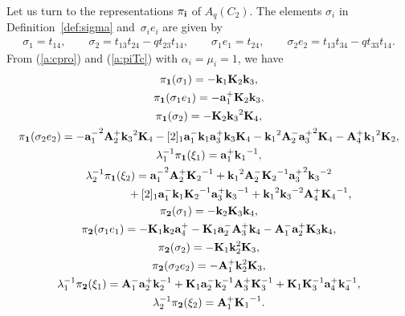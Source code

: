 \documentclass[11pt]{article}
\begin{document}
Let us turn to the representations $\pi_{{\bf i}}$ of $A_q(C_2)$.
The elements $\sigma_i$ in Def\/inition~\ref{def:sigma}
and~$\sigma_ie_i$
are given by
\begin{gather}\label{c:kobetsu}
\sigma_1 = t_{14}, \qquad
\sigma_2 = t_{13}t_{24}-qt_{23}t_{14},\qquad
\sigma_1 e_1 = t_{24},\qquad
\sigma_2e_2 = t_{13}t_{34}-qt_{33}t_{14}.
\end{gather}
From (\ref{a:cpro}) and (\ref{a:piTc}) with $\alpha_i=\mu_i=1$, we have
\begin{gather*}
\pi_{\bf 1}(\sigma_1)=- {{\bf k}_1}
{{\bf K}_2} {{\bf k}_3},\\
\pi_{\bf 1}(\sigma_1e_1)=- {{\bf a}^+_1}
{{\bf K}_2} {{\bf k}_3},\\
\pi_{\bf 1}(\sigma_2)=- {{\bf K}_2}
{{\bf k}_3}^{2} {{\bf K}_4},\\
\pi_{\bf 1}(\sigma_2e_2)=- {{\bf a}^-_1}^2
{{\bf A}^+_2} {{\bf k}_3}^{2} {{\bf K}_4}
-[2]_1 {{\bf a}^-_1} {{\bf k}_1}
{{\bf a}^+_3} {{\bf k}_3} {{\bf K}_4}
- {{\bf k}_1}^{2} {{\bf A}^-_2} {{\bf a}^+_3}^2
{{\bf K}_4}
- {{\bf A}^+_4} {{\bf k}_1}^{2} {{\bf K}_2},\\
\lambda_1^{-1}\pi_{\bf 1}(\xi_1)={{\bf a}^
+_1} {{\bf k}_1}^{-1},\\
\lambda_2^{-1}\pi_{\bf 1}(\xi_2) ={{\bf a}^-
_1}^2 {{\bf A}^+_2} {{\bf K}_2}^{-1}
+{{\bf k}_1}^{2} {{\bf A}^-_2} {{\bf K}_2}^{-1}
{{\bf a}^+_3}^2 {{\bf k}_3}^{-2}\\
\hphantom{\lambda_2^{-1}\pi_{\bf 1}(\xi_2) =}{}
+[2]_1 {{\bf a}^-_1} {{\bf k}_1}
{{\bf K}_2}^{-1} {{\bf a}^+_3} {{\bf k}_3}^{-1}
+{{\bf k}_1}^{2} {{\bf k}_3}^{-2} {{\bf A}^+_4}
{{\bf K}_4}^{-1},\\
\pi_{\bf 2}(\sigma_1)=- {\bf k}_2 {\bf
K}_3 {\bf k}_4,\\
\pi_{\bf 2}(\sigma_1e_1) =- {{\bf K}_1}
{\bf k}_2 {{\bf a}^+_4}
- {{\bf K}_1} {{\bf a}^-_2} {{\bf A}^+_3} {\bf
k}_4
- {{\bf A}^-_1} {{\bf a}^+_2} {\bf K}_3 {\bf k}
_4,\\
\pi_{\bf 2}(\sigma_2)=- {{\bf K}_1}
{\bf k}_2^2 {\bf K}_3,\\
\pi_{\bf 2}(\sigma_2e_2)=- {{\bf A}^+_1}
{\bf k}_2^2 {\bf K}_3,\\
\lambda_1^{-1}\pi_{\bf 2}(\xi_1)={{\bf A}^-
_1} {{\bf a}^+_2} {\bf k}_2^{-1}
+{{\bf K}_1} {{\bf a}^-_2} {\bf k}_2^{-1}
{{\bf A}^+_3} {\bf K}_3^{-1}
+{{\bf K}_1} {\bf K}_3^{-1} {{\bf a}^+_4} {\bf
k}_4^{-1},\\
\lambda_2^{-1}\pi_{\bf 2}(\xi_2)={{\bf A}^
+_1} {{\bf K}_1}^{-1}.
\end{gather*}
\end{document}
